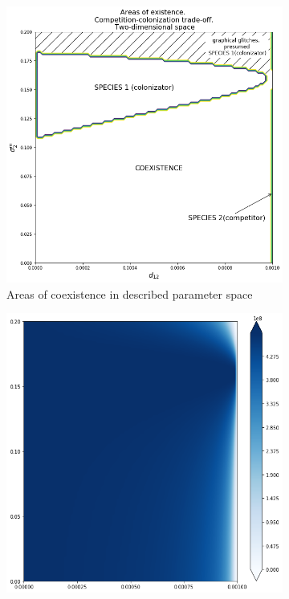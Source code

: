 \begin{figure}
\begin{subfigure}{.5\textwidth}
		\includegraphics[width=.95\linewidth]{arccto08d2.png}
		\caption{Areas of coexistence in described parameter space}
		\label{fig:cctod2:sub2}
	\end{subfigure}
	\centering
	\begin{subfigure}{.5\textwidth}
		\centering
		\includegraphics[width=.95\linewidth]{ccto_d2_n1.png}

\end{subfigure}
\end{figure}
